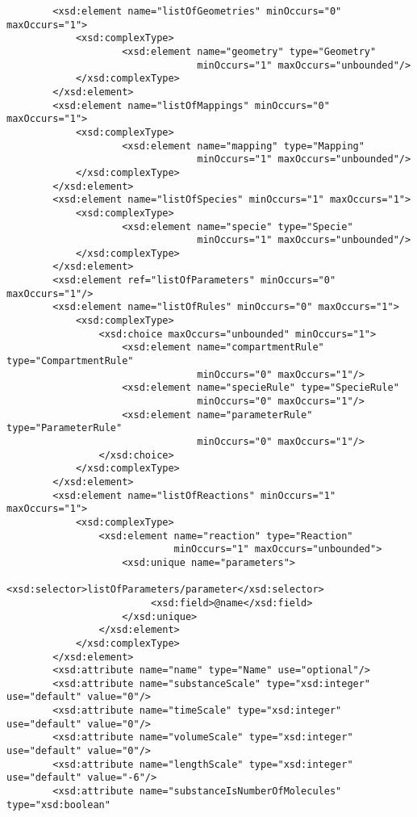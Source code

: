 \documentclass[10pt]{cek-article}
\begin{document}
\begin{small}
\begin{verbatim}
        <xsd:element name="listOfGeometries" minOccurs="0" maxOccurs="1">
            <xsd:complexType>
                    <xsd:element name="geometry" type="Geometry"
                                 minOccurs="1" maxOccurs="unbounded"/>
            </xsd:complexType>
        </xsd:element>
        <xsd:element name="listOfMappings" minOccurs="0" maxOccurs="1">
            <xsd:complexType>
                    <xsd:element name="mapping" type="Mapping"
                                 minOccurs="1" maxOccurs="unbounded"/>
            </xsd:complexType>
        </xsd:element>
        <xsd:element name="listOfSpecies" minOccurs="1" maxOccurs="1">
            <xsd:complexType>
                    <xsd:element name="specie" type="Specie"
                                 minOccurs="1" maxOccurs="unbounded"/>
            </xsd:complexType>
        </xsd:element>
        <xsd:element ref="listOfParameters" minOccurs="0" maxOccurs="1"/>
        <xsd:element name="listOfRules" minOccurs="0" maxOccurs="1">
            <xsd:complexType>
                <xsd:choice maxOccurs="unbounded" minOccurs="1">
                    <xsd:element name="compartmentRule" type="CompartmentRule"
                                 minOccurs="0" maxOccurs="1"/>
                    <xsd:element name="specieRule" type="SpecieRule"
                                 minOccurs="0" maxOccurs="1"/>
                    <xsd:element name="parameterRule" type="ParameterRule"
                                 minOccurs="0" maxOccurs="1"/>
                </xsd:choice>
            </xsd:complexType>
        </xsd:element>
        <xsd:element name="listOfReactions" minOccurs="1" maxOccurs="1">
            <xsd:complexType>
                <xsd:element name="reaction" type="Reaction"
                             minOccurs="1" maxOccurs="unbounded">
                    <xsd:unique name="parameters">
                         <xsd:selector>listOfParameters/parameter</xsd:selector>
                         <xsd:field>@name</xsd:field>
                    </xsd:unique>
                </xsd:element>
            </xsd:complexType>
        </xsd:element>
        <xsd:attribute name="name" type="Name" use="optional"/>
        <xsd:attribute name="substanceScale" type="xsd:integer" use="default" value="0"/>
        <xsd:attribute name="timeScale" type="xsd:integer" use="default" value="0"/>
        <xsd:attribute name="volumeScale" type="xsd:integer" use="default" value="0"/>
        <xsd:attribute name="lengthScale" type="xsd:integer" use="default" value="-6"/>
        <xsd:attribute name="substanceIsNumberOfMolecules" type="xsd:boolean"

\end{verbatim}
\end{small}
\end{document}
